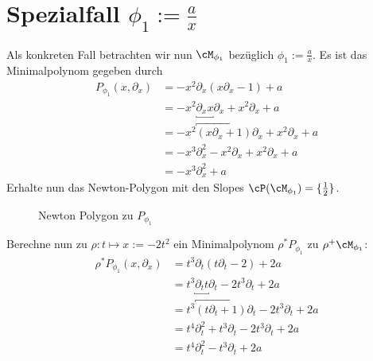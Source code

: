 \section{Spezialfall $\phi_1:=\frac{a}{x}$}
Als konkreten Fall betrachten wir nun $\cM_{\phi_1}$ bezüglich
$\phi_1:=\frac{a}{x}$. Es ist das Minimalpolynom gegeben durch
\begin{align*}
P_{\phi_1}(x,\partial_x) &=-x^2\partial_x (x\partial_x-1)+a \\
  &=-x^2\underbracket{\partial_xx}\partial_x+x^2\partial_x+a \\
  &=-x^2\overbracket{(x\partial_x+1)}\partial_x+x^2\partial_x+a \\
  &=-x^3\partial_x^2 - x^2\partial_x+x^2\partial_x+a \\
  &=-x^3\partial_x^2+a
\end{align*}
Erhalte nun das Newton-Polygon mit den Slopes
$\cP(\cM_{\phi_1})=\{\frac{1}{2}\}$.
\begin{figure}[H]
\caption{Newton Polygon zu $P_{\phi_1}$}
\begin{center}
\end{center}
\end{figure}
Berechne nun zu $\rho:t\mapsto x:=-2t^2$ ein Minimalpolynom $\rho^*P_{\phi_1}$
zu $\rho^+\cM_{\phi_1}$:
\begin{align*}
\rho^*P_{\phi_1}(x,\partial_x)
  &=t^{3}\partial_t(t\partial_t-2)+2a\\
  &=t^{3}\underbracket{\partial_tt}\partial_t-2t^{3}\partial_t+2a\\
  &=t^{3}\overbracket{(t\partial_t+1)}\partial_t-2t^{3}\partial_t+2a\\
  &=t^{4}\partial_t^2+t^{3}\partial_t-2t^{3}\partial_t+2a\\
  &=t^{4}\partial_t^2-t^{3}\partial_t+2a
\end{align*}
\iffalse
  \begin{comment}
  \begin{align*}
  \rho^*P_{\phi_1}(x,\partial_x)
    &=-\frac{1}{2}t^{3}\partial_t
      (\frac{1}{2}t\partial_t-1)+a\\
    &=-\frac{1}{4}t^{3}\underbracket{\partial_tt}\partial_t
      +\frac{1}{2}t^{3}\partial_t+a\\
    &=-\frac{1}{4}t^{3}\overbracket{(t\partial_t+1)}\partial_t
      +\frac{1}{2}t^{3}\partial_t+a\\
    &=-\frac{1}{4}t^{4}\partial_t^2
      \underbracket{-\frac{1}{4}t^{3}\partial_t+\frac{1}{2}t^{3}\partial_t}+a\\
    &=-\frac{1}{4}t^{4}\partial_t^2
      \overbracket{+\frac{1}{4}t^{3}\partial_t}+a
  \end{align*}
  \end{comment}
